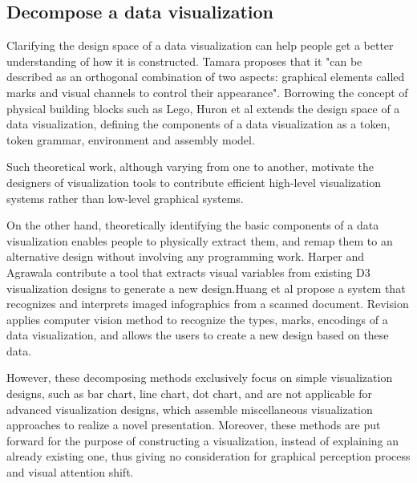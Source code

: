 \documentclass[review,journal]{vgtc}         %
\begin{document}
\subsection{Decompose a data visualization}
Clarifying the design space of a data visualization can help people get a better understanding of how it is constructed. Tamara \cite{munzner_visualization_2014} proposes that it "can be described as an orthogonal combination of two aspects: graphical elements called marks and visual channels to control their appearance". Borrowing the concept of physical building blocks such as Lego, Huron et al \cite{huron_constructive_2014} extends the design space of a data visualization, defining the components of a data visualization as a token, token grammar, environment and assembly model.\par 
Such theoretical work, although varying from one to another, motivate the designers of visualization tools to contribute efficient high-level visualization systems rather than low-level graphical systems.\cite{bostock_protovis:_2009,mendez_ivolver:_2016} \par 
On the other hand, theoretically identifying the basic components of a data visualization enables people to physically extract them, and remap them to an alternative design without involving any programming work. Harper and Agrawala \cite{harper_deconstructing_2014} contribute a tool that extracts visual variables from existing D3 visualization designs to generate a new design.Huang et al\cite{Huang:2007:SUI:1284420.1284427} propose a system that recognizes and interprets imaged
infographics from a scanned document. Revision\cite{savva_revision:_2011} applies computer vision method to recognize the types, marks, encodings of a data visualization, and allows the users to create a new design based on these data. \par 
However, these decomposing methods exclusively focus on simple visualization designs, such as bar chart, line chart, dot chart, and are not applicable for advanced visualization designs, which assemble miscellaneous visualization approaches to realize a novel presentation. Moreover, these methods are put forward for the purpose of constructing a visualization, instead of explaining an already existing one, thus giving no consideration for graphical perception process and visual attention shift.\par 
\end{document}
